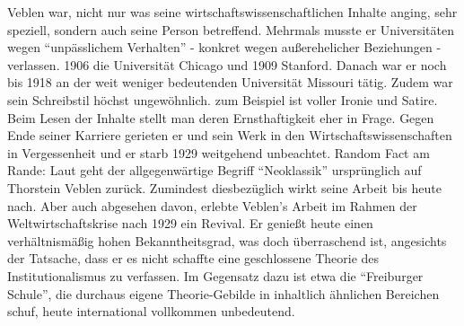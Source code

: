 Veblen war, nicht nur was seine wirtschaftswissenschaftlichen Inhalte anging, sehr speziell, sondern auch seine Person betreffend. Mehrmals musste er Universitäten wegen "`unpässlichem Verhalten"' - konkret wegen außerehelicher Beziehungen - verlassen. 1906 die Universität Chicago und 1909 Stanford. Danach war er noch bis 1918 an der weit weniger bedeutenden Universität Missouri tätig. Zudem war sein Schreibstil höchst ungewöhnlich. \textcite{Veblen1899} zum Beispiel ist voller Ironie und Satire. Beim Lesen der Inhalte stellt man deren Ernsthaftigkeit eher in Frage. Gegen Ende seiner Karriere gerieten er und sein Werk in den Wirtschaftswissenschaften in Vergessenheit und er starb 1929 weitgehend unbeachtet. Random Fact am Rande: Laut \textcite{Aspromourgos1986} geht der allgegenwärtige Begriff "`Neoklassik"' ursprünglich auf Thorstein Veblen zurück. Zumindest diesbezüglich wirkt seine Arbeit bis heute nach. Aber auch abgesehen davon, erlebte Veblen's Arbeit im Rahmen der Weltwirtschaftskrise nach 1929 ein Revival. Er genießt heute einen verhältnismäßig hohen Bekanntheitsgrad, was doch überraschend ist, angesichts der Tatsache, dass er es nicht schaffte eine geschlossene Theorie des Institutionalismus zu verfassen. Im Gegensatz dazu ist etwa die "`Freiburger Schule"', die durchaus eigene Theorie-Gebilde in inhaltlich ähnlichen Bereichen schuf, heute international vollkommen unbedeutend. 

